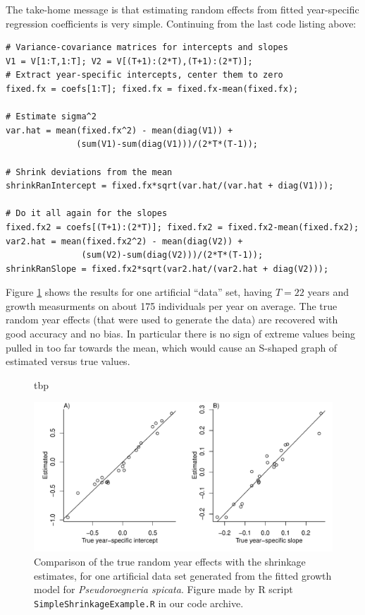 \documentclass[12pt]{article}
\begin{document}
The take-home message is that estimating random effects from fitted year-specific regression 
coefficients is very simple. Continuing from the last code listing above: 
\begin{lstlisting}
# Variance-covariance matrices for intercepts and slopes
V1 = V[1:T,1:T]; V2 = V[(T+1):(2*T),(T+1):(2*T)]; 
# Extract year-specific intercepts, center them to zero   
fixed.fx = coefs[1:T]; fixed.fx = fixed.fx-mean(fixed.fx); 

# Estimate sigma^2
var.hat = mean(fixed.fx^2) - mean(diag(V1)) + 
              (sum(V1)-sum(diag(V1)))/(2*T*(T-1)); 

# Shrink deviations from the mean 
shrinkRanIntercept = fixed.fx*sqrt(var.hat/(var.hat + diag(V1)));

# Do it all again for the slopes 
fixed.fx2 = coefs[(T+1):(2*T)]; fixed.fx2 = fixed.fx2-mean(fixed.fx2); 
var2.hat = mean(fixed.fx2^2) - mean(diag(V2)) + 
               (sum(V2)-sum(diag(V2)))/(2*T*(T-1)); 
shrinkRanSlope = fixed.fx2*sqrt(var2.hat/(var2.hat + diag(V2))); 
\end{lstlisting}

Figure \ref{fig:compareShrinkage} shows the results for one artificial ``data'' set, having $T=22$ years and growth measurments on 
about 175 individuals per year on average. The true random year effects (that were used to generate the data) are recovered
with good accuracy and no bias. In particular there is no sign of extreme values being pulled in too far
towards the mean, which would cause an S-shaped graph of estimated versus true values. 

\begin{figure}{tbp}
\centerline{\includegraphics[width=\textwidth]{figures/SimpleShrinkage.pdf}}
\caption{Comparison of the true random year effects with the shrinkage estimates, for one artificial data set
generated from the fitted growth model for  \emph{Pseudoroegneria spicata}. Figure made by R script 
\texttt{SimpleShrinkageExample.R} in our code archive.} 
\label{fig:compareShrinkage}
\end{figure}
\end{document}
